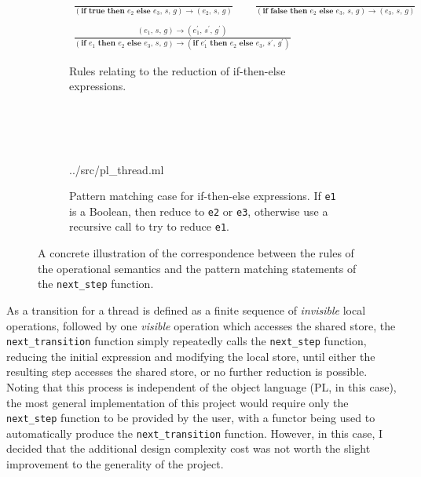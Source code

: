 \documentclass[12pt,a4paper,twoside,openright]{report}
\begin{document}
\begin{figure}
	\begin{subfigure}{\textwidth}
		\begin{gather*}
		\frac{}
		{(\textbf{if true then } e_2 \textbf{ else }
				e_3,\,s,\,g) \rightarrow (e_2,\,s,\,g)}
		\qquad
		\frac{}
		{(\textbf{if false then } e_2 \textbf{ else }
			e_3,\,s,\,g) \rightarrow (e_3,\,s,\,g)} \\
		\\
		\frac{(e_1,\,s,\,g) \rightarrow
			(e_1^{\prime},\,s^{\prime},\,g^{\prime})}
		{(\textbf{if } e_1 \textbf{ then }
			e_2 \textbf{ else } e_3,\,s,\,g)
			\rightarrow (\textbf{if } e_1^{\prime}
			 \textbf{ then }
			e_2 \textbf{ else } e_3,\,
			s^{\prime},\,g^{\prime})}
		\end{gather*}
		\caption{Rules relating to
			the reduction of if-then-else expressions.}
	\end{subfigure}
	\\ \\ \\
	\begin{subfigure}{\textwidth}
		
			{../src/pl_thread.ml}
		\caption{Pattern matching case for if-then-else expressions.
			If \texttt{e1} is a Boolean, then reduce to \texttt{e2} or
			\texttt{e3},
			otherwise use a recursive call to try to reduce \texttt{e1}.}
	\end{subfigure}
	\caption{A concrete illustration of the correspondence
		between the rules of the operational semantics
		and the pattern matching statements of the
		\texttt{next\_step} function.}
	\label{fig:step-rule-correspondence}
\end{figure}

As a transition for a thread is defined as a
finite sequence of \emph{invisible} local
operations, followed by one \emph{visible} operation
which accesses the shared store, the \texttt{next\_transition}
function simply repeatedly calls the \texttt{next\_step}
function, reducing the initial expression and modifying
the local store, until either the resulting step accesses the shared
store, or no further reduction is possible. Noting that this
process is independent of the object language (PL, in this case),
the most general implementation of this project would require
only the  \texttt{next\_step} function to be provided by
the user, with a functor being used to automatically
produce the \texttt{next\_transition} function. However,
in this case, I decided that the additional design complexity
cost was not worth the slight improvement to the generality
of the project.
\end{document}
